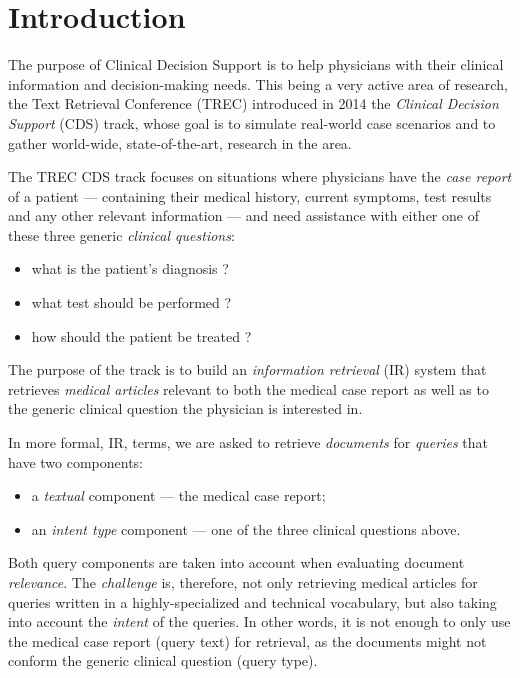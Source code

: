 \chapter{Introduction}
The purpose of Clinical Decision Support is to help physicians with their clinical information and decision-making needs.
This being a very active area of research, the Text Retrieval Conference (TREC)
introduced in 2014 the \emph{Clinical Decision Support} (CDS) track,
whose goal is to simulate real-world case scenarios and to gather world-wide, state-of-the-art, research in the area.

The TREC CDS track focuses on situations where physicians have the \emph{case report} of a patient 
--- containing their medical history, current symptoms, test results and any other relevant information --- 
and need assistance with either one of these three generic
\emph{clinical questions}: 
\begin{itemize}[noitemsep,nolistsep]
 \item what is the patient's diagnosis ?
 \item what test should be performed ?
 \item how should the patient be treated ?\end{itemize}

The purpose of the track is to build an \emph{information retrieval} (IR) system that
retrieves \emph{medical articles} relevant to both the medical
case report as well as to the generic clinical question the physician is interested in.

In more formal, IR, terms, we are asked to retrieve \emph{documents} for \emph{queries} that have two components:
\begin{itemize}[noitemsep, nolistsep]
 \item a \emph{textual} component --- the medical case report;
 \item an \emph{intent type} component --- one of the three clinical questions above.
\end{itemize}

Both query components are taken into account when evaluating document \emph{relevance}.
The \emph{challenge} is, therefore, not only retrieving medical articles for queries written in a highly-specialized and technical
vocabulary, but also taking into account the \emph{intent} of the queries. 
In other words, it 
is not enough to only use the medical case report (query text)
for retrieval, as the documents might not conform the generic clinical question (query type).


